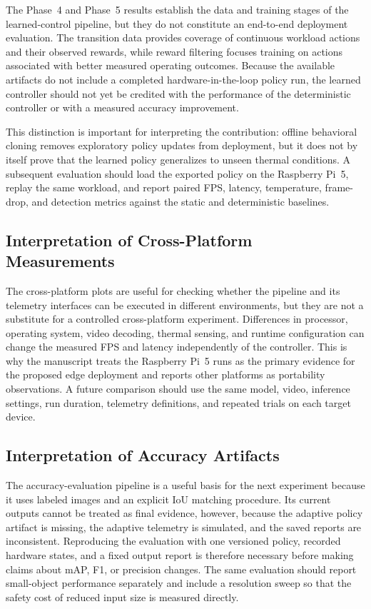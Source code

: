 \documentclass{ieeeaccess}
\begin{document}
The Phase~4 and Phase~5 results establish the data and training stages of the
learned-control pipeline, but they do not constitute an end-to-end deployment
evaluation. The transition data provides coverage of continuous workload
actions and their observed rewards, while reward filtering focuses training on
actions associated with better measured operating outcomes. Because the
available artifacts do not include a completed hardware-in-the-loop policy
run, the learned controller should not yet be credited with the performance
of the deterministic controller or with a measured accuracy improvement.

This distinction is important for interpreting the contribution: offline
behavioral cloning removes exploratory policy updates from deployment, but it
does not by itself prove that the learned policy generalizes to unseen thermal
conditions. A subsequent evaluation should load the exported policy on the
Raspberry Pi~5, replay the same workload, and report paired FPS, latency,
temperature, frame-drop, and detection metrics against the static and
deterministic baselines.

\subsection{Interpretation of Cross-Platform Measurements}

The cross-platform plots are useful for checking whether the pipeline and its
telemetry interfaces can be executed in different environments, but they are
not a substitute for a controlled cross-platform experiment. Differences in
processor, operating system, video decoding, thermal sensing, and runtime
configuration can change the measured FPS and latency independently of the
controller. This is why the manuscript treats the Raspberry Pi~5 runs as the
primary evidence for the proposed edge deployment and reports other platforms
as portability observations. A future comparison should use the same model,
video, inference settings, run duration, telemetry definitions, and repeated
trials on each target device.

\subsection{Interpretation of Accuracy Artifacts}

The accuracy-evaluation pipeline is a useful basis for the next experiment
because it uses labeled images and an explicit IoU matching procedure. Its
current outputs cannot be treated as final evidence, however, because the
adaptive policy artifact is missing, the adaptive telemetry is simulated, and
the saved reports are inconsistent. Reproducing the evaluation with one
versioned policy, recorded hardware states, and a fixed output report is
therefore necessary before making claims about mAP, F1, or precision changes.
The same evaluation should report small-object performance separately and
include a resolution sweep so that the safety cost of reduced input size is
measured directly.
\end{document}
